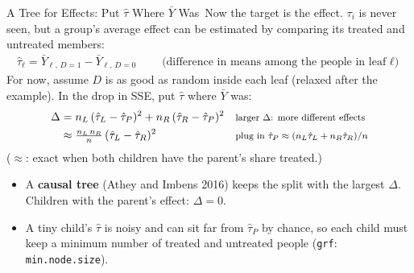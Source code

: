\documentclass[aspectratio=169,11pt,xcolor=dvipsnames]{beamer}
\newcommand{\srcp}[1]{{\scriptsize\color{gray}(#1)}}
\newcommand{\core}{\,\raisebox{0.6pt}{\textcolor{corestar}{$\bigstar$}}}
\begin{document}
\begin{frame}{A Tree for Effects: Put $\hat\tau$ Where $\bar Y$ Was\core}
Now the target is the effect. $\tau_i$ is never seen, but a group's average effect can be estimated by
comparing its treated and untreated members:
\begin{align*}
  \hat\tau_\ell = \bar Y_{\ell,\,D=1} - \bar Y_{\ell,\,D=0}
  \qquad \text{(difference in means among the people in leaf $\ell$)}
\end{align*}
For now, assume $D$ is as good as random inside each leaf (relaxed after the example). In the drop in SSE, put $\hat\tau$
where $\bar Y$ was:
\begin{align*}
  \Delta
  &= n_L\,(\hat\tau_L - \hat\tau_P)^2 + n_R\,(\hat\tau_R - \hat\tau_P)^2
   && \text{\footnotesize larger $\Delta$: more different effects} \\
  &\approx \tfrac{n_L\,n_R}{n}\,(\hat\tau_L - \hat\tau_R)^2
   && \text{\footnotesize plug in $\hat\tau_P \approx (n_L\hat\tau_L + n_R\hat\tau_R)/n$}
\end{align*}
{\scriptsize ($\approx$: exact when both children have the parent's share treated.)}
\begin{itemize}\itemsep3pt
  \item A \textbf{causal tree} \srcp{Athey and Imbens 2016} keeps the split with the largest $\Delta$. Children with
        the parent's effect: $\Delta = 0$.
  \item A tiny child's $\hat\tau$ is noisy and can sit far from $\hat\tau_P$ by chance, so each child must keep a
        minimum number of treated and untreated people (\texttt{grf}: \texttt{min.node.size}).
\end{itemize}
\end{frame}
\end{document}
